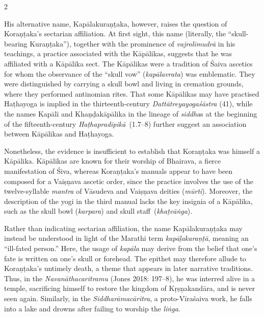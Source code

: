 \begin{nohyp}
\begin{multicols*}{2}
\begin{eng}
His alternative name, Kapālakuraṇṭaka, however, raises the question of Koraṇṭaka's sectarian affiliation. At first sight, this name (literally, the ``skull-bearing Kuraṇṭaka''), together with the prominence of \emph{vajrolīmudrā} in his teachings, a practice associated with the Kāpālikas, suggests that he was affiliated with a Kāpālika sect. The Kāpālikas were a tradition of Śaiva ascetics for whom the observance of the ``skull vow'' (\emph{kapālavrata}) was emblematic. They were distinguished by carrying a skull bowl and living in cremation grounds, where they performed antinomian rites. That some Kāpālikas may have practised Haṭhayoga is implied in the thirteenth-century \emph{Dattātreyayogaśāstra} (41), while the names Kapālī and Khaṇḍakāpālika in the lineage of \emph{siddha}s at the beginning of the fifteenth-century \emph{Haṭhapradīpikā}~(1.7--8) further suggest an association between Kāpālikas and Haṭhayoga.

Nonetheless, the evidence is insufficient to establish that Koraṇṭaka was himself a Kāpālika. Kāpālikas are known for their worship of Bhairava, a fierce manifestation of Śiva, whereas Koraṇṭaka's manuals appear to have been composed for a Vaiṣṇava ascetic order, since the practice involves the use of the twelve-syllable \emph{mantra} of Vāsudeva and Vaiṣṇava deities (\emph{mūrti}). Moreover, the description of the yogi in the third manual lacks the key insignia of a Kāpālika, such as the skull bowl (\emph{karpara}) and skull staff~(\emph{khaṭvāṅga}).

Rather than indicating sectarian affiliation, the name Kapālakuraṇṭaka may instead be understood in light of the Marathi term \emph{kapāḷakaraṇṭā}, meaning an ``ill-fated person.'' Here, the usage of \emph{kapāla} may derive from the belief that one's fate is written on one's skull or forehead. The epithet may therefore allude to Koraṇṭaka's untimely death, a theme that appears in later narrative traditions. Thus, in the \emph{Navanāthacaritramu} (Jones 2018: 197--8), he was interred alive in a temple, sacrificing himself to restore the kingdom of Kṛṣṇakandāra, and is never seen again. Similarly, in the \emph{Siddharāmacāritra}, a proto-Vīraśaiva work, he falls into a lake and drowns after failing to worship the \emph{liṅga}.
\vskip 18pt


\end{eng}
\end{multicols*}
\end{nohyp}
